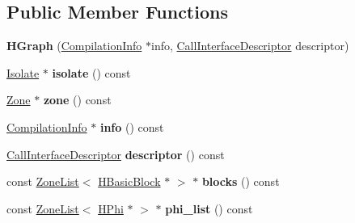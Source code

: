 \subsection*{Public Member Functions}
\begin{DoxyCompactItemize}
\item 
{\bfseries H\+Graph} (\hyperlink{classv8_1_1internal_1_1_compilation_info}{Compilation\+Info} $\ast$info, \hyperlink{classv8_1_1internal_1_1_call_interface_descriptor}{Call\+Interface\+Descriptor} descriptor)\hypertarget{classv8_1_1internal_1_1_h_graph_af7118368e6ac3c82caa5e03798b631be}{}\label{classv8_1_1internal_1_1_h_graph_af7118368e6ac3c82caa5e03798b631be}

\item 
\hyperlink{classv8_1_1internal_1_1_isolate}{Isolate} $\ast$ {\bfseries isolate} () const \hypertarget{classv8_1_1internal_1_1_h_graph_a30035ffc39015ed0fb2fa8aff4dffe9f}{}\label{classv8_1_1internal_1_1_h_graph_a30035ffc39015ed0fb2fa8aff4dffe9f}

\item 
\hyperlink{classv8_1_1internal_1_1_zone}{Zone} $\ast$ {\bfseries zone} () const \hypertarget{classv8_1_1internal_1_1_h_graph_aad6e72e873e172a4c16f67a5a34dd039}{}\label{classv8_1_1internal_1_1_h_graph_aad6e72e873e172a4c16f67a5a34dd039}

\item 
\hyperlink{classv8_1_1internal_1_1_compilation_info}{Compilation\+Info} $\ast$ {\bfseries info} () const \hypertarget{classv8_1_1internal_1_1_h_graph_acafb049ab00ae5821b3ee7f15025760d}{}\label{classv8_1_1internal_1_1_h_graph_acafb049ab00ae5821b3ee7f15025760d}

\item 
\hyperlink{classv8_1_1internal_1_1_call_interface_descriptor}{Call\+Interface\+Descriptor} {\bfseries descriptor} () const \hypertarget{classv8_1_1internal_1_1_h_graph_a72fb5bfd0a080705eaeed0185bbd2594}{}\label{classv8_1_1internal_1_1_h_graph_a72fb5bfd0a080705eaeed0185bbd2594}

\item 
const \hyperlink{classv8_1_1internal_1_1_zone_list}{Zone\+List}$<$ \hyperlink{classv8_1_1internal_1_1_h_basic_block}{H\+Basic\+Block} $\ast$ $>$ $\ast$ {\bfseries blocks} () const \hypertarget{classv8_1_1internal_1_1_h_graph_a0eea252671d47a213e9a2f2abd60800c}{}\label{classv8_1_1internal_1_1_h_graph_a0eea252671d47a213e9a2f2abd60800c}

\item 
const \hyperlink{classv8_1_1internal_1_1_zone_list}{Zone\+List}$<$ \hyperlink{classv8_1_1internal_1_1_h_phi}{H\+Phi} $\ast$ $>$ $\ast$ {\bfseries phi\+\_\+list} () const \hypertarget{classv8_1_1internal_1_1_h_graph_aa095cee25c0e691f0892c1bf05a5a5ed}{}\label{classv8_1_1internal_1_1_h_graph_aa095cee25c0e691f0892c1bf05a5a5ed}


\end{DoxyCompactItemize}
